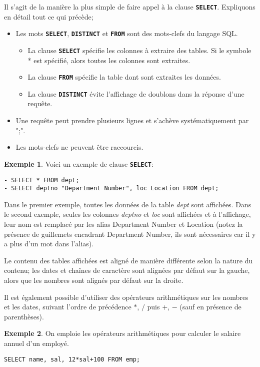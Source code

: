 \documentclass[a4paper, 12pt]{report}
\newcommand{\textSQL}[1]{\texttt{\textbf{#1}}}
\theoremstyle{definition} \newtheorem{ex}{Exemple}
\begin{document}
Il s'agit de la manière la plus simple de faire appel à la clause \textSQL{SELECT}. Expliquons en détail tout ce qui précède;
\begin{itemize}
\item Les mots \textSQL{SELECT}, \textSQL{DISTINCT} et \textSQL{FROM} sont des mots-clefs du langage SQL. 
	\begin{itemize}
		\item La clause \textSQL{SELECT} spécifie les colonnes à extraire des tables. Si le symbole * est spécifié, alors toutes les colonnes sont extraites.
		\item La clause \textSQL{FROM} spécifie la table dont sont extraites les données.
		\item La clause \textSQL{DISTINCT} évite l'affichage de doublons dans la réponse d'une requête.
	\end{itemize}
\item Une requête peut prendre plusieurs lignes et s'achève systématiquement par ";".
\item Les mots-clefs ne peuvent être raccourcis.
\end{itemize}
\begin{ex}
Voici un exemple de clause \textSQL{SELECT}:

\begin{lstlisting}[frame=single]
- SELECT * FROM dept;
- SELECT deptno "Department Number", loc Location FROM dept; 
\end{lstlisting}
Dans le premier exemple, toutes les données de la table \emph{dept} sont affichées. Dans le second exemple, seules les colonnes \emph{deptno} et \emph{loc} sont affichées et  à l'affichage, leur nom est remplacé par les alias Department Number et Location (notez la présence de guillemets encadrant Department Number, ils sont nécessaires car il y a plus d'un mot dans l'alias).
\end{ex}

 Le contenu des tables affichées est aligné de manière différente selon la nature du contenu; les dates et chaînes de caractère sont alignées par défaut sur la gauche, alors que les nombres sont alignés par défaut sur la droite.

Il est également possible d'utiliser des opérateurs arithmétiques sur les nombres et les dates, suivant l'ordre de précédence $*$, $/$ puis $+$, $-$ (sauf en présence de parenthèses).
\begin{ex}
On emploie les opérateurs arithmétiques pour calculer le salaire annuel d'un employé.
\begin{lstlisting}[frame=single]
SELECT name, sal, 12*sal+100 FROM emp;
\end{lstlisting}
\end{ex}
\end{document}
